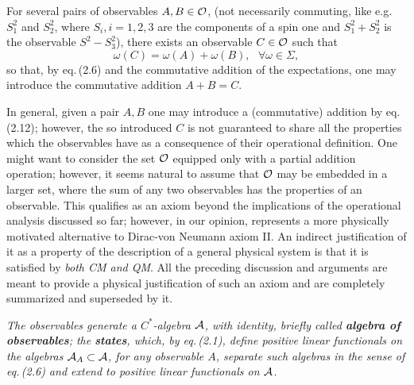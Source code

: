 \documentclass[12pt]{article}
\def \be {\begin{equation}}
\def \ee {\end{equation}}
\def \om {{\omega}}
\def \A {{\cal A}}
\def \O {{\cal O}}
\begin{document}
 \vspace{2mm} For several pairs of observables $A, B \in \O$, (not necessarily commuting, like e.g. $S_1^2$ and $S_2^2$,  where $S_i, i = 1, 2, 3$ are the components of a spin one and $S_1^2 + S_2^2$ is the observable $S^2 - S_3^2$),  there exists an observable $C \in \O$ such that \be{\om(C) = \om(A) + \om(B), \,\,\,\,\forall \om \in \Sigma,}\ee so that, by  eq.\,(2.6) and the commutative addition of the  expectations, one may introduce the commutative addition $ A + B = C$.
  
In general, given a pair $A, B$ one may introduce a (commutative)  addition by eq.\,(2.12); however, the so introduced $C$ is not guaranteed to share all the properties which the observables have as a consequence of their operational definition. One might want to consider the set $\O$  equipped only with a partial addition operation; however, it seems natural to assume that $\O$ may be embedded in a larger set, where the sum of any two observables has the properties of an observable. This qualifies as an axiom beyond the implications of the operational analysis discussed so far; however, in our opinion, represents a more physically motivated alternative to Dirac-von Neumann axiom II. An indirect justification of it  as a  property of the description of a general physical system is that it is satisfied by {\em  both CM and QM}. All the preceding discussion and arguments are meant to provide  a physical justification of such an axiom and are completely summarized and superseded by it. 

\vspace{2mm}  {\em The  observables generate a $C^*$-algebra $\A$, with identity,  briefly called {\bf algebra of observables};  the {\bf states}, which, by eq.\,(2.1),  define positive linear functionals on the algebras $\A_A \subset \A$, for any observable $A$, separate such algebras in the sense of eq.\,(2.6) and extend to positive linear functionals on $\A$.} 

  
\end{document}
